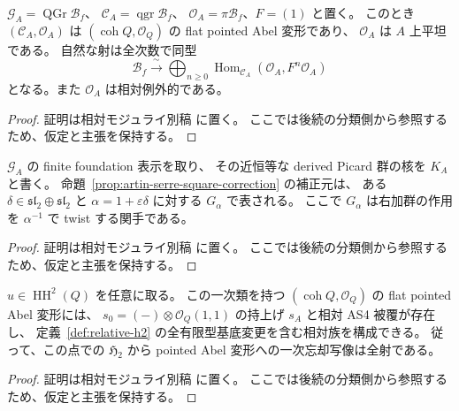 \begin{lemma}[商圏の平坦性と全次数の飽和]
\label{lem:quadric-first-order-flat-saturated}
$\mathcal G_A=\operatorname{QGr}\mathcal B_f$、
$\mathcal C_A=\operatorname{qgr}\mathcal B_f$、
$\mathcal O_A=\pi\mathcal B_f$、$F=(1)$ と置く。
このとき $(\mathcal C_A,\mathcal O_A)$ は
$(\operatorname{coh}Q,\mathcal O_Q)$ の flat pointed Abel 変形であり、
$\mathcal O_A$ は $A$ 上平坦である。
自然な射は全次数で同型
\[
 \mathcal B_f\xrightarrow{\ \sim\ }
 \bigoplus_{n\ge0}\operatorname{Hom}_{\mathcal C_A}
       (\mathcal O_A,F^n\mathcal O_A)
\]
となる。また $\mathcal O_A$ は相対例外的である。
\end{lemma}
\begin{proof}
証明は相対モジュライ別稿 \cite[\texttt{quadric_first_order} 節]{QuadricModuli2026} に置く。
ここでは後続の分類側から参照するため、仮定と主張を保持する。
\end{proof}

\begin{lemma}[平方根補正の全近恒等方向は次数付き自己同型から来る]
\label{lem:quadric-first-order-correction-geometric}
$\mathcal G_A$ の finite foundation 表示を取り、
その近恒等な derived Picard 群の核を $K_A$ と書く。
命題~\ref{prop:artin-serre-square-correction} の補正元は、
ある $\delta\in\mathfrak{sl}_2\oplus\mathfrak{sl}_2$ と
$\alpha=1+\varepsilon\delta$ に対する $G_\alpha$ で表される。
ここで $G_\alpha$ は右加群の作用を $\alpha^{-1}$ で twist する関手である。
\end{lemma}
\begin{proof}
証明は相対モジュライ別稿 \cite[\texttt{quadric_first_order} 節]{QuadricModuli2026} に置く。
ここでは後続の分類側から参照するため、仮定と主張を保持する。
\end{proof}

\begin{theorem}
\label{thm:quadric-all-first-order-h2}
$u\in\operatorname{HH}^2(Q)$ を任意に取る。
この一次類を持つ $(\operatorname{coh}Q,\mathcal O_Q)$ の flat pointed Abel 変形には、
$s_0=(-)\otimes\mathcal O_Q(1,1)$ の持上げ $s_A$ と相対 AS4 被覆が存在し、
定義~\ref{def:relative-h2} の全有限型基底変更を含む相対族を構成できる。
従って、この点での $\mathfrak H_2$ から pointed Abel 変形への一次忘却写像は全射である。
\end{theorem}
\begin{proof}
証明は相対モジュライ別稿 \cite[\texttt{quadric_first_order} 節]{QuadricModuli2026} に置く。
ここでは後続の分類側から参照するため、仮定と主張を保持する。
\end{proof}


